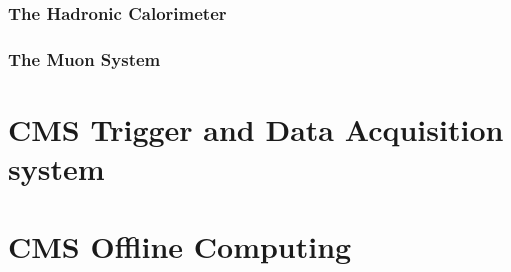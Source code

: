 \subsubsection{The Hadronic Calorimeter} %
\label{sub:the_hadronic_calorimeter}

\subsubsection{The Muon System} %
\label{sub:the_muon_system}



\section{CMS Trigger and Data Acquisition system} %
\label{sec:cms_trigger_and_data_acquisition_system}


\section{CMS Offline Computing} %
\label{sec:cms_offline_computing}














